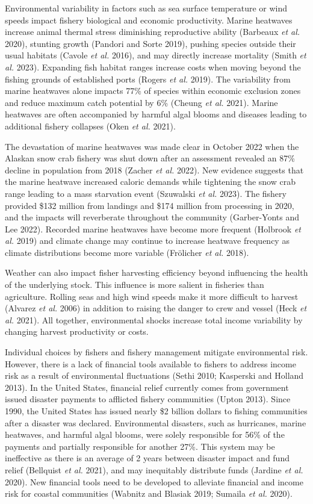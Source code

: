 \documentclass[
  letterpaper,
  DIV=11,
  numbers=noendperiod]{scrartcl}
\theoremstyle{plain}
\theoremstyle{plain}
\theoremstyle{remark}
\begin{document}
Environmental variability in factors such as sea surface temperature or
wind speeds impact fishery biological and economic productivity. Marine
heatwaves increase animal thermal stress diminishing reproductive
ability (Barbeaux \emph{et al.} 2020), stunting growth (Pandori and
Sorte 2019), pushing species outside their usual habitats (Cavole
\emph{et al.} 2016), and may directly increase mortality (Smith \emph{et
al.} 2023). Expanding fish habitat ranges increase costs when moving
beyond the fishing grounds of established ports (Rogers \emph{et al.}
2019). The variability from marine heatwaves alone impacts 77\% of
species within economic exclusion zones and reduce maximum catch
potential by 6\% (Cheung \emph{et al.} 2021). Marine heatwaves are often
accompanied by harmful algal blooms and diseases leading to additional
fishery collapses (Oken \emph{et al.} 2021).

The devastation of marine heatwaves was made clear in October 2022 when
the Alaskan snow crab fishery was shut down after an assessment revealed
an 87\% decline in population from 2018 (Zacher \emph{et al.} 2022). New
evidence suggests that the marine heatwave increased caloric demands
while tightening the snow crab range leading to a mass starvation event
(Szuwalski \emph{et al.} 2023). The fishery provided \$132 million from
landings and \$174 million from processing in 2020, and the impacts will
reverberate throughout the community (Garber-Yonts and Lee 2022).
Recorded marine heatwaves have become more frequent (Holbrook \emph{et
al.} 2019) and climate change may continue to increase heatwave
frequency as climate distributions become more variable (Frölicher
\emph{et al.} 2018).

Weather can also impact fisher harvesting efficiency beyond influencing
the health of the underlying stock. This influence is more salient in
fisheries than agriculture. Rolling seas and high wind speeds make it
more difficult to harvest (Alvarez \emph{et al.} 2006) in addition to
raising the danger to crew and vessel (Heck \emph{et al.} 2021). All
together, environmental shocks increase total income variability by
changing harvest productivity or costs.

Individual choices by fishers and fishery management mitigate
environmental risk. However, there is a lack of financial tools
available to fishers to address income risk as a result of environmental
fluctuations (Sethi 2010; Kasperski and Holland 2013). In the United
States, financial relief currently comes from government issued disaster
payments to afflicted fishery communities (Upton 2013). Since 1990, the
United States has issued nearly \$2 billion dollars to fishing
communities after a disaster was declared. Environmental disasters, such
as hurricanes, marine heatwaves, and harmful algal blooms, were solely
responsible for 56\% of the payments and partially responsible for
another 27\%. This system may be ineffective as there is an average of 2
years between disaster impact and fund relief (Bellquist \emph{et al.}
2021), and may inequitably distribute funds (Jardine \emph{et al.}
2020). New financial tools need to be developed to alleviate financial
and income risk for coastal communities (Wabnitz and Blasiak 2019;
Sumaila \emph{et al.} 2020).
\end{document}
